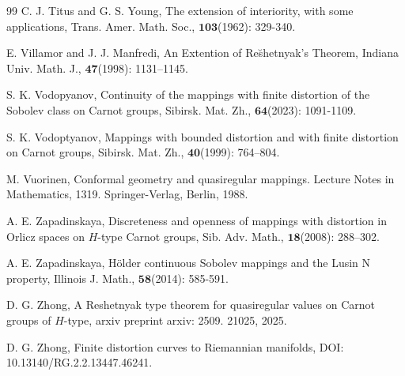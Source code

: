 \documentclass[11pt,twoside]{article}
\theoremstyle{definition}
\theoremstyle{remark}
\begin{document}
\begin{thebibliography}{99}
C. J. Titus and G. S. Young, The extension of interiority, with some applications, Trans. Amer. Math. Soc., $\mathbf{103}$(1962): 329-340.


E. Villamor and J. J. Manfredi, An Extention of Re\u{s}hetnyak’s Theorem, Indiana Univ. Math. J.,  $\mathbf{47}$(1998): 1131–1145.

S. K. Vodopyanov,  Continuity of the mappings with finite distortion of the Sobolev class on Carnot groups, Sibirsk. Mat. Zh., $\mathbf{64}$(2023): 1091-1109.




S. K. Vodoptyanov,  Mappings with bounded distortion and with finite distortion on Carnot groups, Sibirsk. Mat. Zh., $\mathbf{40}$(1999): 764–804.










 M. Vuorinen, Conformal geometry and quasiregular mappings. Lecture Notes in Mathematics, 1319. Springer-Verlag, Berlin, 1988.




 A. E. Zapadinskaya, Discreteness and openness of mappings with distortion in Orlicz spaces on $H$-type Carnot groups, Sib. Adv. Math., $\mathbf{18}$(2008): 288–302. 

A. E. Zapadinskaya, H\"{o}lder continuous Sobolev mappings and the Lusin N property, Illinois J. Math., $\mathbf{58}$(2014): 585-591.




D. G. Zhong,
A Reshetnyak type theorem for quasiregular values on Carnot groups of $H$-type, arxiv preprint arxiv: 2509. 21025, 2025.



D. G. Zhong, Finite distortion curves to Riemannian manifolds, DOI: 10.13140/RG.2.2.13447.46241.

\end{thebibliography}
\end{document}
